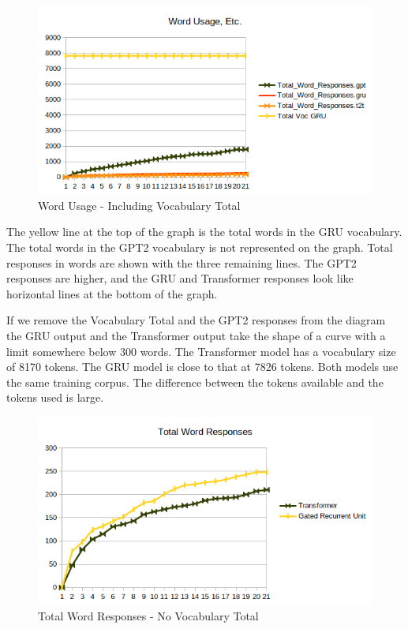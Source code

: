 \begin{figure}[H]
	\begin{center}
		\includegraphics[scale=0.75]{diagram-word02}
		
		
	\end{center}
	\caption[Word Usage]{Word Usage - Including Vocabulary Total}
	
	
\end{figure}

The yellow line at the top of the graph is the total words in the GRU vocabulary. The total words in the GPT2 vocabulary is not represented on the graph. Total responses in words are shown with the three remaining lines. The GPT2 responses are higher, and the GRU and Transformer responses look like horizontal lines at the bottom of the graph.

If we remove the Vocabulary Total and the GPT2 responses from the diagram the GRU output and the Transformer output take the shape of a curve with a limit somewhere below 300 words. The Transformer model has a vocabulary size of 8170 tokens. The GRU model is close to that at 7826 tokens. Both models use the same training corpus. The difference between the tokens available and the tokens used is large.


\begin{figure}[H]
	\begin{center}
		\includegraphics[scale=0.75]{diagram-word01}
		
		
	\end{center}
	\caption[Total Word Responses]{Total Word Responses - No Vocabulary Total}
	
	
\end{figure}

